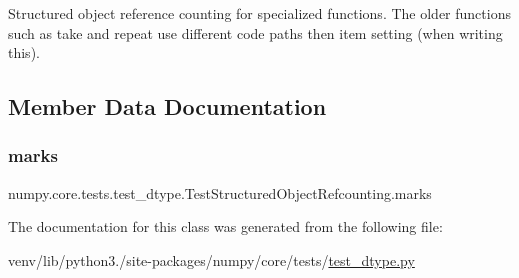 \begin{DoxyVerb}Structured object reference counting for specialized functions.
The older functions such as take and repeat use different code paths
then item setting (when writing this).
\end{DoxyVerb}
 

\subsection{Member Data Documentation}
\mbox{\label{classnumpy_1_1core_1_1tests_1_1test__dtype_1_1TestStructuredObjectRefcounting_a85e7a93f63811dbea44ec0de506bb316}} 
\subsubsection{\texorpdfstring{marks}{marks}}
{\footnotesize\ttfamily numpy.\+core.\+tests.\+test\+\_\+dtype.\+Test\+Structured\+Object\+Refcounting.\+marks\hspace{0.3cm}{\ttfamily [static]}}



The documentation for this class was generated from the following file\+:\begin{DoxyCompactItemize}
\item 
venv/lib/python3./site-\/packages/numpy/core/tests/\hyperlink{test__dtype_8py}{test\+\_\+dtype.\+py}\end{DoxyCompactItemize}
